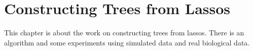\chapter{Constructing Trees from Lassos}
\label{cha:lasso-construction}

This chapter is about the work on constructing trees from lassos.  There is an
algorithm and some experiments using simulated data and real biological data.



